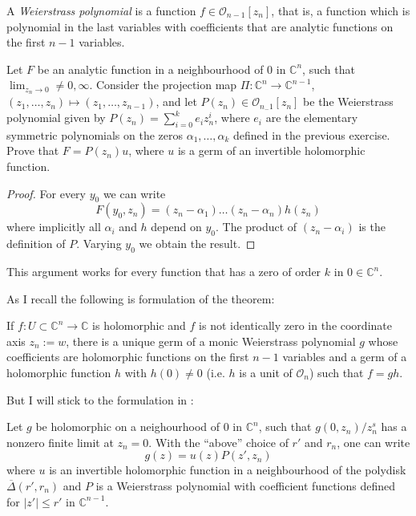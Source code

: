 \begin{definition}
\label{definition-weierstrass-polynomial}
A {\it Weierstrass polynomial} is a function $f \in \mathcal{O}_{n-1}[z_n]$,
that is, a function which is polynomial in the last variables with coefficients
that are analytic functions on the first $n-1$ variables.
\end{definition}

\begin{exercise}
\label{exercise-weierstrass-preparation-theorem}
Let $F$ be an analytic function in a neighbourhood of $0$ in $\mathbb{C}^n$,
such that $\lim_{z_n\to 0}\neq 0,\infty$. Consider the projection map
$\Pi:\mathbb{C}^n\to\mathbb{C}^{n-1}$, 
$(z_1,\ldots,z_n)\mapsto(z_1,\ldots,z_{n-1})$, and let 
$P(z_n)\in \mathcal{O}_{n_-1}[z_n]$ be the Weierstrass polynomial given by 
$P(z_n)=\sum_{i=0}^ke_iz_n^i$, where $e_i$ are the elementary symmetric
polynomials on the zeros $\alpha_1,\ldots,\alpha_k$ defined in the previous
exercise. Prove that $F=P(z_n)u$, where $u$ is a germ of an invertible
holomorphic function.
\end{exercise}

\begin{proof}
For every $y_0$ we can write
$$
F(y_0,z_n)=(z_n-\alpha_1)\ldots(z_n-\alpha_n)h(z_n)
$$
where implicitly all $\alpha_i$ and $h$ depend on $y_0$. The product of 
$(z_n-\alpha_i)$ is the definition of $P$. Varying $y_0$ we obtain the result.
\end{proof}

This argument works for every function that has a zero of order $k$ in
$0\in\mathbb{C}^n$.

As I recall the following is \cite{GH} formulation of the theorem:

\begin{theorem}
If $f:U\subset\mathbb{C}^n\to\mathbb{C}$ is holomorphic and $f$ is not
identically zero in the coordinate axis $z_n:=w$, there
is a unique germ of a monic Weierstrass polynomial $g$ whose coefficients are
holomorphic functions on the first $n-1$ variables 
and a germ of a holomorphic 
function $h$ with $h(0)\neq 0$ 
(i.e. $h$ is a unit of $\mathcal{O}_n$)
such that $f=gh$.
\end{theorem}

\noindent
But I will stick to the formulation in \cite{Demailly}:

\begin{theorem}
\label{theorem-weierstrass-preparation-theorem}
Let $g$ be holomorphic on a neighourhood of $0$ in $\mathbb{C}^n$,
such that $g(0,z_n)/z_n^s$ has a nonzero finite limit at $z_n=0$.
With the ``above'' choice of $r'$ and $r_n$,
one can write 
$$
g(z)=u(z)P(z',z_n)
$$
where $u$ is an invertible holomorphic function
in a neighbourhood of the polydisk $\overline{\Delta}(r',r_n)$ 
and $P$ is a Weierstrass polynomial with coefficient
functions defined for $|z'|\leq r'$ in $\mathbb{C}^{n-1}$.
\end{theorem}

